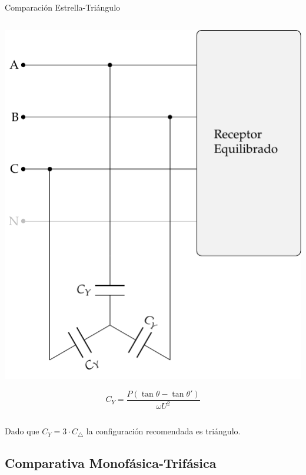 \documentclass[aspectratio=169, usenames,svgnames,dvipsnames]{beamer}
\begin{document}
\begin{frame}[label={sec:org28560b8}]{Comparación Estrella-Triángulo}
\begin{columns}
\begin{column}{0.5\columnwidth}
\begin{center}
\includegraphics[height=0.55\textheight]{../figs/CircuitoTrifasicaY_CompensacionReactiva.pdf}
\end{center}
\[
  \boxed{C_Y = \frac{P(\tan \theta - \tan \theta')}{\omega U^2}}
\]

\medskip
\end{column}
\end{columns}

Dado que \(C_Y = 3 \cdot C_\triangle\) la \alert{configuración recomendada} es \alert{triángulo}.
\end{frame}
\subsection{Comparativa Monofásica-Trifásica}
\label{sec:org776f8fb}
\end{document}
